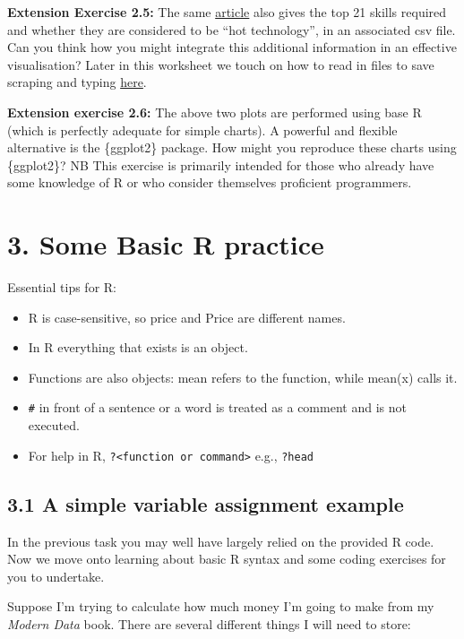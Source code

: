 \documentclass[
]{article}
\providecommand{\tightlist}{%
  \setlength{\itemsep}{0pt}\setlength{\parskip}{0pt}}
\begin{document}
\textbf{Extension Exercise 2.5:} The same
\href{https://www.onetonline.org/link/demand/15-2051.00}{article} also
gives the top 21 skills required and whether they are considered to be
``hot technology'', in an associated csv file. Can you think how you
might integrate this additional information in an effective
visualisation? Later in this worksheet we touch on how to read in files
to save scraping and typing \hyperref[WS_ReadingCSV]{here}.

\textbf{Extension exercise 2.6:} The above two plots are performed using
base R (which is perfectly adequate for simple charts). A powerful and
flexible alternative is the \{ggplot2\} package. How might you reproduce
these charts using \{ggplot2\}? NB This exercise is primarily intended
for those who already have some knowledge of R or who consider
themselves proficient programmers.

\section{3. Some Basic R practice}\label{WS3}

Essential tips for R:

\begin{itemize}
\tightlist
\item
  R is case-sensitive, so price and Price are different names.
\item
  In R everything that exists is an object.
\item
  Functions are also objects: mean refers to the function, while mean(x)
  calls it.
\item
  \texttt{\#} in front of a sentence or a word is treated as a comment
  and is not executed.
\item
  For help in R,
  \texttt{?\textless{}function\ or\ command\textgreater{}} e.g.,
  \texttt{?head}
\end{itemize}

\subsection{3.1 A simple variable assignment
example}\label{a-simple-variable-assignment-example}

In the previous task you may well have largely relied on the provided R
code. Now we move onto learning about basic R syntax and some coding
exercises for you to undertake.

Suppose I'm trying to calculate how much money I'm going to make from my
\emph{Modern Data} book. There are several different things I will need
to store:
\end{document}
